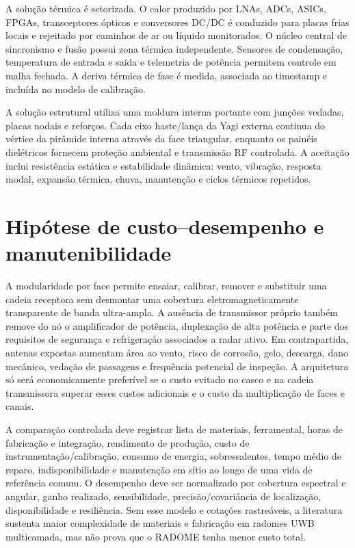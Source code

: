 A solução térmica é setorizada. O calor produzido por LNAs, ADCs, ASICs, FPGAs, transceptores ópticos e conversores DC/DC é conduzido para placas frias locais e rejeitado por caminhos de ar ou líquido monitorados. O núcleo central de sincronismo e fusão possui zona térmica independente. Sensores de condensação, temperatura de entrada e saída e telemetria de potência permitem controle em malha fechada. A deriva térmica de fase é medida, associada ao timestamp e incluída no modelo de calibração.

A solução estrutural utiliza uma moldura interna portante com junções vedadas, placas nodais e reforços. Cada eixo haste/lança da Yagi externa continua do vértice da pirâmide interna através da face triangular, enquanto os painéis dielétricos fornecem proteção ambiental e transmissão RF controlada. A aceitação inclui resistência estática e estabilidade dinâmica: vento, vibração, resposta modal, expansão térmica, chuva, manutenção e ciclos térmicos repetidos.

\section{Hipótese de custo--desempenho e manutenibilidade}
A modularidade por face permite ensaiar, calibrar, remover e substituir uma cadeia receptora sem desmontar uma cobertura eletromagneticamente transparente de banda ultra-ampla. A ausência de transmissor próprio também remove do nó o amplificador de potência, duplexação de alta potência e parte dos requisitos de segurança e refrigeração associados a radar ativo. Em contrapartida, antenas expostas aumentam área ao vento, risco de corrosão, gelo, descarga, dano mecânico, vedação de passagens e frequência potencial de inspeção. A arquitetura só será economicamente preferível se o custo evitado no casco e na cadeia transmissora superar esses custos adicionais e o custo da multiplicação de faces e canais.

A comparação controlada deve registrar lista de materiais, ferramental, horas de fabricação e integração, rendimento de produção, custo de instrumentação/calibração, consumo de energia, sobressalentes, tempo médio de reparo, indisponibilidade e manutenção em sítio ao longo de uma vida de referência comum. O desempenho deve ser normalizado por cobertura espectral e angular, ganho realizado, sensibilidade, precisão/covariância de localização, disponibilidade e resiliência. Sem esse modelo e cotações rastreáveis, a literatura sustenta maior complexidade de materiais e fabricação em radomes UWB multicamada, mas não prova que o RADOME tenha menor custo total.

